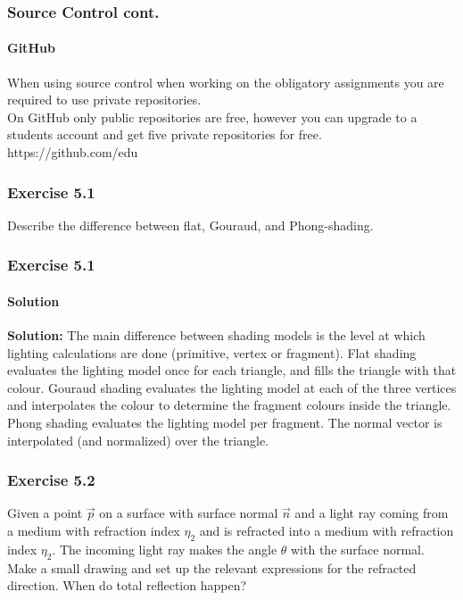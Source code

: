 \documentclass[11pt]{beamer}
\begin{document}
	\begin{frame}
		\frametitle{Source Control cont.}
		\framesubtitle{GitHub}
		When using source control when working on the obligatory assignments you are required to use private repositories. \\ 
		On GitHub only public repositories are free, however you can upgrade to a students account and get five private repositories for free.\\
		https://github.com/edu
		
	\end{frame}	  	
  	
  	\begin{frame}
    		\frametitle{Exercise 5.1}
		\begin{center}
    		Describe the difference between flat, Gouraud, and Phong-shading.
		\end{center}		    		
  	\end{frame}

	\begin{frame}
    		\frametitle{Exercise 5.1}
    		\framesubtitle{Solution}
		\textbf{Solution:}	
		The main difference between shading models is the level at which lighting
calculations are done (primitive, vertex or fragment).
Flat shading evaluates the lighting model once for each triangle, and fills the triangle with
that colour.
Gouraud shading evaluates the lighting model at each of the three vertices and interpolates
the colour to determine the fragment colours inside the triangle.
Phong shading evaluates the lighting model per fragment. The normal vector is interpolated
(and normalized) over the triangle.		    		
		    
  	\end{frame}
  	
  	\begin{frame}
  		\frametitle{Exercise 5.2}
    		Given a point $\vec{p}$ on a surface with surface normal $\vec{n}$ and a light ray coming from a medium with refraction index $\eta _2$ and is refracted into a medium with refraction index $\eta _2$. The
incoming light ray makes the angle $\theta$ with the surface normal.
Make a small drawing and set up the relevant expressions for the refracted direction.
When do total reflection happen?
  	\end{frame}
\end{document}
